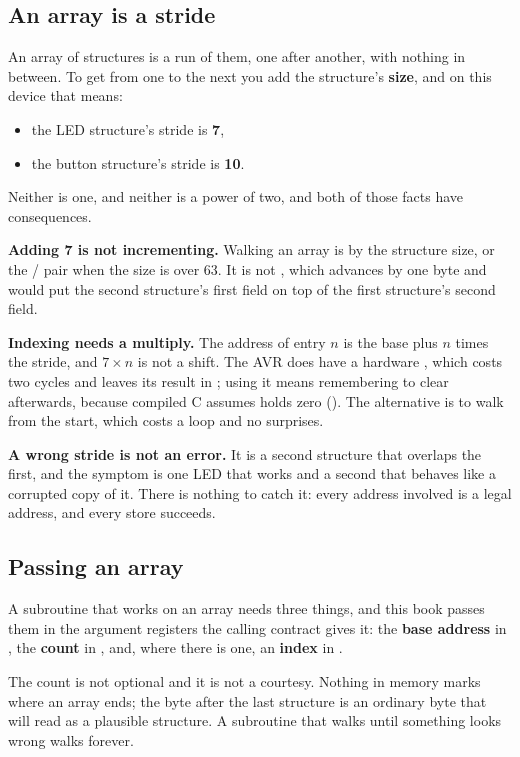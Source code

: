 \subsection{An array is a stride}
\label{c4:sec:stride}
An array of structures is a run of them, one after another, with nothing in between. To get from
one to the next you add the structure's \textbf{size}, and on this device that means:
\begin{itemize}
  \item the LED structure's stride is \textbf{7},
  \item the button structure's stride is \textbf{10}.
\end{itemize}
Neither is one, and neither is a power of two, and both of those facts have consequences.

\textbf{Adding 7 is not incrementing.} Walking an array is  by the structure size, or
the / pair when the size is over 63. It is not , which advances by
one byte and would put the second structure's first field on top of the first structure's second
field.

\textbf{Indexing needs a multiply.} The address of entry $n$ is the base plus $n$ times the stride,
and $7 \times n$ is not a shift. The AVR does have a hardware , which costs two cycles
and leaves its result in ; using it means remembering to clear  afterwards,
because compiled C assumes  holds zero (). The alternative is to
walk from the start, which costs a loop and no surprises.

\textbf{A wrong stride is not an error.} It is a second structure that overlaps the first, and the
symptom is one LED that works and a second that behaves like a corrupted copy of it. There is
nothing to catch it: every address involved is a legal address, and every store succeeds.

\subsection{Passing an array}
\label{c4:sec:passing}
A subroutine that works on an array needs three things, and this book passes them in the argument
registers the calling contract gives it: the \textbf{base address} in , the
\textbf{count} in , and, where there is one, an \textbf{index} in .

The count is not optional and it is not a courtesy. Nothing in memory marks where an array ends;
the byte after the last structure is an ordinary byte that will read as a plausible structure. A
subroutine that walks until something looks wrong walks forever.

